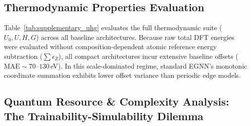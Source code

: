 \documentclass[10pt,twocolumn,letterpaper]{article}
\begin{document}
\subsection{Thermodynamic Properties Evaluation}

Table~\ref{tab:supplementary_uhg} evaluates the full thermodynamic suite ($U_0, U, H, G$) across all baseline architectures. Because raw total DFT energies were evaluated without composition-dependent atomic reference energy subtraction ($\sum \epsilon_Z$), all compact architectures incur extensive baseline offsets ($\text{MAE} \sim 70\text{--}130$\,eV). In this scale-dominated regime, standard EGNN's monotonic coordinate summation exhibits lower offset variance than periodic edge models.



\subsection{Quantum Resource \& Complexity Analysis: The Trainability-Simulability Dilemma}

\begin{table}[t]
\centering
\small
\caption{\textbf{Resource \& Complexity Comparison} across equivariant models, contrasting quantum requirements with classical counterparts. PRISM eliminates quantum statevector memory, gate depth, and sampling shot noise while matching or exceeding Q-PRISM accuracy.}
\label{tab:resources}
\end{table}
\end{document}
